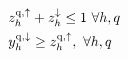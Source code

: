 \documentclass[conference]{IEEEtran}
\begin{document}
\begin{subequations}
\begin{align}
        \  & z_{h}^{\rm{q},\uparrow} + z_{h}^{\downarrow} \leq 1 \                                                           \forall{h,q} \label{aux:7}                                                                                                                                                                                                                                                                                                                                                                                               \\
        \  & y^{\rm{q},\downarrow}_{h} \geq z^{\rm{q},\uparrow}_{h}, \                                                                                                                                                                                                                                                                 \forall{h,q} \label{rebound:1}                                                                                                                                                                                     \\

\end{align}
\end{subequations}
\end{document}
